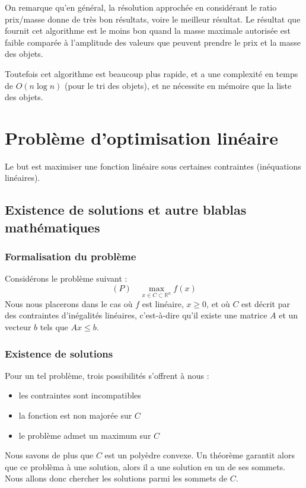 \documentclass{scrartcl}
\begin{document}
    On remarque qu'en général, la résolution approchée en considérant le ratio
    \nobreak prix/masse donne de très bon résultats, voire le meilleur
    résultat. Le résultat que fournit cet algorithme est le moins bon quand la
    masse maximale autorisée est faible comparée à l'amplitude des valeurs que
    peuvent prendre le prix et la masse des objets.
    
    Toutefois cet algorithme est beaucoup plus rapide, et a une complexité en
    temps de $O(n \log n)$ (pour le tri des objets), et ne nécessite en mémoire
    que la liste des objets.

\section{Problème d'optimisation linéaire} %
  Le but est maximiser une fonction linéaire sous certaines contraintes
  (inéquations linéaires).

  \subsection{Existence de solutions et autre blablas mathématiques}
    \subsubsection{Formalisation du problème}
      Considérons le problème suivant :
      $$ (P) \quad \max_{x\in C \subset \mathbb{R}^n} f(x)$$
      Nous nous placerons dans le cas où $f$ est linéaire, $x \geqslant 0$, 
      et où $C$ est décrit par des contraintes d'inégalités linéaires, 
      c'est-à-dire qu'il existe une matrice $A$ et un vecteur $b$ tels 
      que $Ax\leqslant b$.

    \subsubsection{Existence de solutions}
      Pour un tel problème, trois possibilités s'offrent à nous :
      \begin{itemize}
        \item les contraintes sont incompatibles
        \item la fonction est non majorée sur $C$
        \item le problème admet un maximum sur $C$
      \end{itemize}
      Nous savons de plus que $C$ est un polyèdre convexe. Un théorème garantit
      alors que ce problèma à une solution, alors il a une solution en un de
      ses sommets. Nous allons donc chercher les solutions parmi les sommets de
      $C$.
\end{document}
